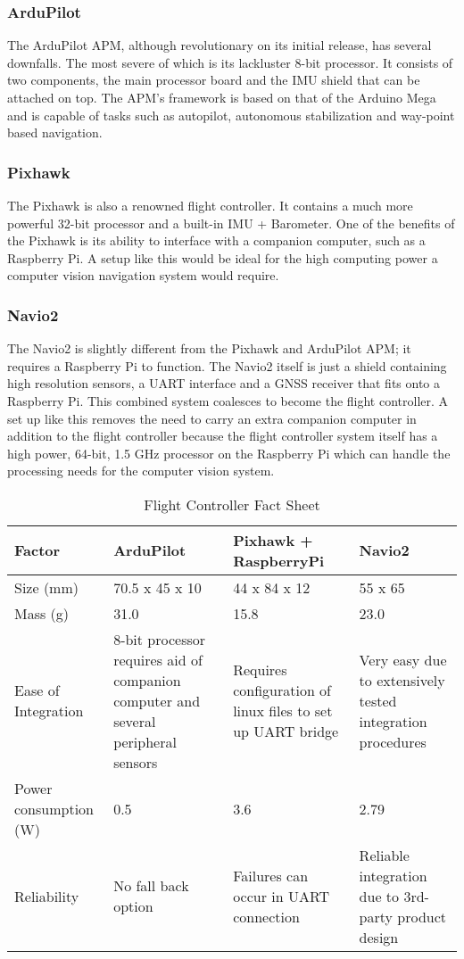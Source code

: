 		\subsubsection{ArduPilot}
			The ArduPilot APM, although revolutionary on its initial release, has several downfalls. The most severe of which is its lackluster 8-bit processor. It consists of two components, the main processor board and the IMU shield that can be attached on top. The APM’s framework is based on that of the Arduino Mega and is capable of tasks such as autopilot, autonomous stabilization and way-point based navigation.

		\subsubsection{Pixhawk}
			The Pixhawk is also a renowned flight controller. It contains a much more powerful 32-bit processor and a built-in IMU + Barometer. One of the benefits of the Pixhawk is its ability to interface with a companion computer, such as a Raspberry Pi. A setup like this would be ideal for the high computing power a computer vision navigation system would require.

		\subsubsection{Navio2}
			The Navio2 is slightly different from the Pixhawk and ArduPilot APM; it requires a Raspberry Pi to function. The Navio2 itself is just a shield containing high resolution sensors, a UART interface and a GNSS receiver that fits onto a Raspberry Pi. This combined system coalesces to become the flight controller. A set up like this removes the need to carry an extra companion computer in addition to the flight controller because the flight controller system itself has a high power, 64-bit, 1.5 GHz processor on the Raspberry Pi which can handle the processing needs for the computer vision system.

		\begin{table}[H]
			\centering
			\caption{Flight Controller Fact Sheet}
			\label{tab: flight controller}
			\begin{tabularx}{1\linewidth}{X X X X}
				\toprule
				Factor & ArduPilot & Pixhawk + RaspberryPi & Navio2 \\
			   \midrule
			   	Size (mm) & 70.5 x 45 x 10 & 44 x 84 x 12 & 55 x 65 \\
				Mass (g) & 31.0 & 15.8 & 23.0 \\
				Ease of Integration & 8-bit processor requires aid of companion \mbox{computer} and several peripheral sensors & Requires configuration of linux files to set up UART bridge & Very easy due to extensively tested integration procedures\\
				Power \newline consumption (W) & 0.5 & 3.6 & 2.79 \\
				Reliability & No fall back option & Failures can occur in UART connection & Reliable integration due to 3rd-party product \mbox{design} \\
				\bottomrule
			\end{tabularx}
		\end{table}
